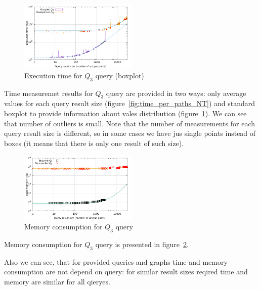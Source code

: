 \begin{figure}[h]
  \begin{center}
    \includegraphics[width=0.5\textwidth]{data/time_per_paths_NT_boxplot.pdf}
    \caption{Execution time for $Q_3$ query (boxplot)}
    \label{fig:time_per_paths_NT_boxplot}
  \end{center}
\end{figure}


Time measuremet results for $Q_3$ query are provided in two ways: only average values for each query result size (figure~\ref{fig:time_per_paths_NT}) and standard boxplot to provide information about vales distribution (figure~\ref{fig:time_per_paths_NT_boxplot}). We can see that number of outliers is small. Note that the number of measurements for each query result size is different, so in some cases we have jus single points instead of boxes (it means that there is only one result of such size).


\begin{figure}[h]
  \begin{center}
    \includegraphics[width=0.5\textwidth]{data/mem_per_paths_NT.pdf}
    \caption{Memory consumption for $Q_3$ query}
    \label{fig:mem_per_paths_NT}
  \end{center}
\end{figure}

Memory consumption for $Q_3$ query is presented in figure~\ref{fig:mem_per_paths_NT}.

Also we can see, that for provided queries and graphs time and memory consumption are not depend on query: for similar result sizes reqired time and memory are similar for all qieryes.